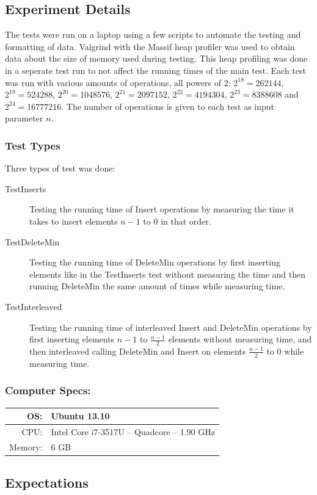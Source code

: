 \subsection{Experiment Details}
The tests were run on a laptop using a few scripts to automate the testing and formatting of data. Valgrind with the Massif heap profiler was used to obtain data about the size of memory used during testing. This heap profiling was done in a seperate test run to not affect the running times of the main test.
Each test was run with various amounts of operations, all powers of 2: $2^{18}=262144$, $2^{19}=524288$, $2^{20}=1048576$, $2^{21}=2097152$, $2^{22}=4194304$, $2^{23}=8388608$ and $2^{24}=16777216$. The number of operations is given to each test as input parameter $n$.

\subsubsection{Test Types}
Three types of test was done:
\begin{description}
\item[TestInserts] Testing the running time of Insert operations by measuring the time it takes to insert elements $n-1$ to $0$ in that order.
\item[TestDeleteMin] Testing the running time of DeleteMin operations by first inserting elements like in the TestInserts test without measuring the time and then running DeleteMin the same amount of times while measuring time.
\item[TestInterleaved] Testing the running time of interleaved Insert and DeleteMin operations by first inserting elements $n-1$ to $\frac{n-1}{2}$ elements without measuring time, and then interleaved calling DeleteMin and Insert on elements $\frac{n-1}{2}$ to $0$ while measuring time.
\end{description}


\subsubsection{Computer Specs:}
\begin{tabular}{| r  l |} \hline
OS: & Ubuntu 13.10 \\ \hline
CPU: & Intel Core i7-3517U -- Quadcore -- 1.90 GHz \\ \hline
Memory: & 6 GB\\ \hline
\end{tabular}

\subsection{Expectations}


